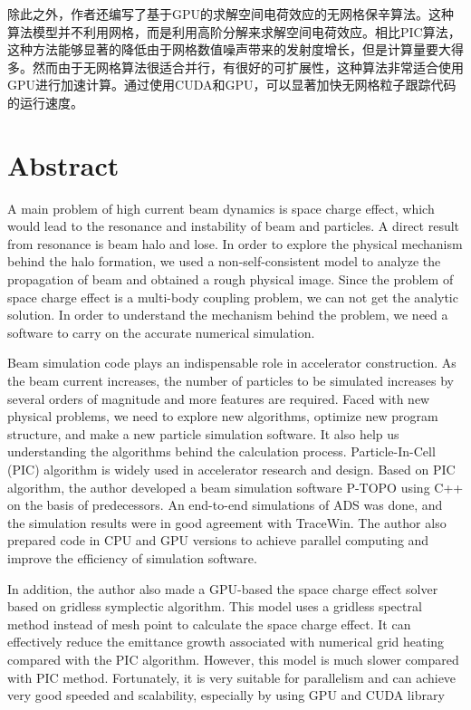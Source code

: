 除此之外，作者还编写了基于GPU的求解空间电荷效应的无网格保辛算法。这种算法模型并不利用网格，而是利用高阶分解来求解空间电荷效应。相比PIC算法，这种方法能够显著的降低由于网格数值噪声带来的发射度增长，但是计算量要大得多。然而由于无网格算法很适合并行，有很好的可扩展性，这种算法非常适合使用GPU进行加速计算。通过使用CUDA和GPU，可以显著加快无网格粒子跟踪代码的运行速度。



\chapter{Abstract}%

A main problem of high current beam dynamics is space charge effect, which would lead to the resonance and instability of beam and particles. A direct result from resonance is beam halo and lose. 
In order to explore the physical mechanism behind the halo formation, we used a non-self-consistent model to analyze the propagation of beam and obtained a rough physical image.
Since the problem of space charge effect is a multi-body coupling problem, we can not get the analytic solution. In order to understand the mechanism behind the problem, we need a software to carry on the accurate numerical simulation.

Beam simulation code plays an indispensable role in accelerator construction. 
As the beam current increases, the number of particles to be simulated increases by several orders of magnitude 
and more features are required. 
Faced with new physical problems, we need to explore new algorithms, optimize new program structure, and make a new particle simulation software.
It also help us understanding the algorithms behind the calculation process.
Particle-In-Cell (PIC) algorithm is widely used in accelerator research and design. 
Based on PIC algorithm, the author developed a beam simulation software P-TOPO using C++ on the basis of predecessors. 
An end-to-end simulations of ADS was done, and the simulation results were in good agreement with TraceWin.
The author also prepared code in CPU and GPU versions to achieve parallel computing and improve the efficiency of simulation software.

In addition, the author also made a GPU-based the space charge effect solver based on gridless symplectic algorithm. 
This model uses a gridless spectral method instead of mesh point to calculate the space charge effect. 
It can effectively reduce the emittance growth associated with numerical grid heating compared with the PIC algorithm.
However, this model is much slower compared with PIC method.
Fortunately, it is very suitable for parallelism and can achieve very good speeded and scalability, especially by using GPU and CUDA library

